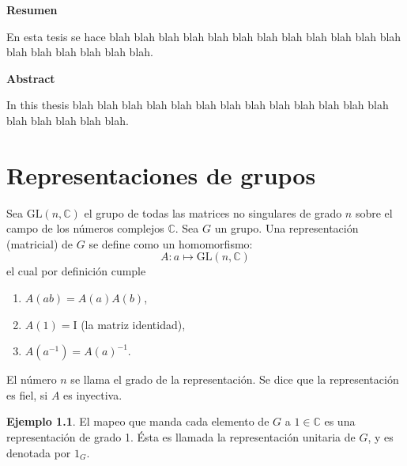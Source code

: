 \documentclass[12pt]{book}
\theoremstyle{definition}
\newtheorem{example}[theorem]{Ejemplo}
\newcounter{in}
\newcounter{ini}
\begin{document}
\thispagestyle{empty}
\begin{flushleft}
  {\bfseries\Large Resumen}
\end{flushleft}

En esta tesis se hace blah blah blah blah blah blah blah blah blah
blah blah blah blah blah blah blah blah blah.

\vspace{2cm}

\begin{flushleft}
  {\bfseries\Large Abstract}
\end{flushleft}

In this thesis blah blah blah blah blah blah blah blah blah
blah blah blah blah blah blah blah blah blah.

 \newpage \thispagestyle{empty}

\chapter{Representaciones de grupos}
\label{cha:Representaciones de grupos}

Sea $ \mathrm{GL}(n,\mathbb{C})$ el grupo de todas las matrices no
singulares de grado $n$ sobre el campo de los números complejos
$\mathbb{C}$. Sea $G$ un grupo. Una representación (matricial) de $G$
se define como un homomorfismo:
\begin{equation*}
  A \colon a \mapsto \mathrm{GL}(n,\mathbb{C})
\end{equation*}
el cual por definición cumple
\begin{enumerate}
\item $A\left(ab\right)=A\left(a\right)A\left(b\right)$,
\item $A\left(1\right)=\mathrm{I}$ (la matriz identidad),
\item $A\left(a^{-1}\right)=A\left(a\right)^{-1}$.
\end{enumerate}
El número $n$ se llama el grado de la representación. Se dice que la
representación es fiel, si $A$ es inyectiva.

\begin{example}
  \label{Ej6}
  El mapeo que manda cada elemento de $G$ a $1
  \in \mathbb{C}$ es una representación de grado 1. Ésta es llamada la
  representación unitaria de $G$, y es denotada por $1_{G}$. 
\end{example}
 
\end{document}
